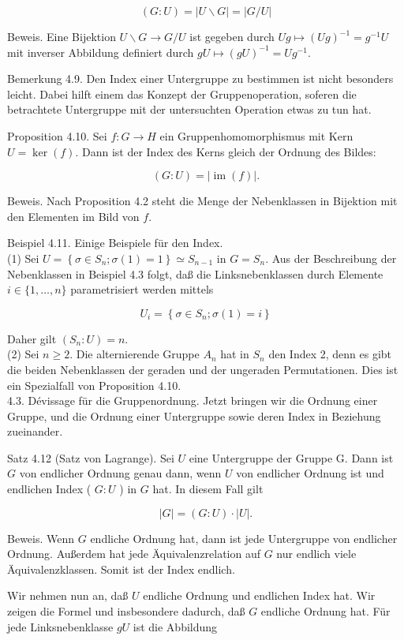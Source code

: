 \documentclass[10pt, letterpaper]{article}
\begin{document}
$$
(G: U)=|U \backslash G|=|G / U|
$$

Beweis. Eine Bijektion $U \backslash G \rightarrow G / U$ ist gegeben durch $U g \mapsto(U g)^{-1}=g^{-1} U$ mit inverser Abbildung definiert durch $g U \mapsto(g U)^{-1}=U g^{-1}$.

Bemerkung 4.9. Den Index einer Untergruppe zu bestimmen ist nicht besonders leicht. Dabei hilft einem das Konzept der Gruppenoperation, soferen die betrachtete Untergruppe mit der untersuchten Operation etwas zu tun hat.

Proposition 4.10. Sei $f: G \rightarrow H$ ein Gruppenhomomorphismus mit Kern $U=\operatorname{ker}(f)$. Dann ist der Index des Kerns gleich der Ordnung des Bildes:

$$
(G: U)=|\operatorname{im}(f)| .
$$

Beweis. Nach Proposition 4.2 steht die Menge der Nebenklassen in Bijektion mit den Elementen im Bild von $f$.

Beispiel 4.11. Einige Beispiele für den Index.\\
(1) Sei $U=\left\{\sigma \in S_{n} ; \sigma(1)=1\right\} \simeq S_{n-1}$ in $G=S_{n}$. Aus der Beschreibung der Nebenklassen in Beispiel 4.3 folgt, daß die Linksnebenklassen durch Elemente $i \in\{1, \ldots, n\}$ parametrisiert werden mittels

$$
U_{i}=\left\{\sigma \in S_{n} ; \sigma(1)=i\right\}
$$

Daher gilt $\left(S_{n}: U\right)=n$.\\
(2) Sei $n \geq 2$. Die alternierende Gruppe $A_{n}$ hat in $S_{n}$ den Index 2, denn es gibt die beiden Nebenklassen der geraden und der ungeraden Permutationen. Dies ist ein Spezialfall von Proposition 4.10.\\
4.3. Dévissage für die Gruppenordnung. Jetzt bringen wir die Ordnung einer Gruppe, und die Ordnung einer Untergruppe sowie deren Index in Beziehung zueinander.

Satz 4.12 (Satz von Lagrange). Sei $U$ eine Untergruppe der Gruppe G. Dann ist $G$ von endlicher Ordnung genau dann, wenn $U$ von endlicher Ordnung ist und endlichen Index ( $G: U$ ) in $G$ hat. In diesem Fall gilt

$$
|G|=(G: U) \cdot|U| .
$$

Beweis. Wenn $G$ endliche Ordnung hat, dann ist jede Untergruppe von endlicher Ordnung. Außerdem hat jede Äquivalenzrelation auf $G$ nur endlich viele Äquivalenzklassen. Somit ist der Index endlich.

Wir nehmen nun an, daß $U$ endliche Ordnung und endlichen Index hat. Wir zeigen die Formel und insbesondere dadurch, daß $G$ endliche Ordnung hat. Für jede Linksnebenklasse $g U$ ist die Abbildung
\end{document}
